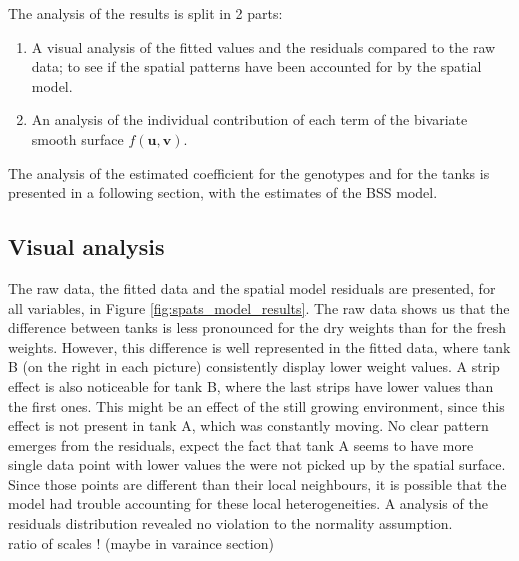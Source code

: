 The analysis of the results is split in 2 parts:
\begin{enumerate}
	\item A visual analysis of the fitted values and the residuals compared to the raw data; to see if the 
	spatial patterns have been accounted for by the spatial model.
	\item An analysis of the individual contribution of each term of the bivariate smooth surface $f(\mathbf{u},\mathbf{v})$.
\end{enumerate}
The analysis of the estimated coefficient for the genotypes and for the tanks is presented in a following section, with the estimates of the BSS model.

\subsection{Visual analysis}
The raw data, the fitted data and the spatial model residuals are presented, for all variables, in Figure \ref{fig:spats_model_results}. The raw data shows us that the difference between tanks is less pronounced for the dry weights than for the fresh weights. However, this difference is well represented in the fitted data, where tank B (on the right in each picture) consistently display lower weight values. A strip effect is also noticeable for tank B, where the last strips have lower values than the first ones. This might be an effect of the still growing environment, since this effect is not present in tank A, which was constantly moving. No clear pattern emerges from the residuals, expect the fact that tank A seems to have more single data point with lower values the were not picked up by the spatial surface. Since those points are different than their local neighbours, it is possible that the model had trouble accounting for these local heterogeneities. A analysis of the residuals distribution revealed no violation to the normality assumption.\\

ratio of scales ! (maybe in varaince section)

